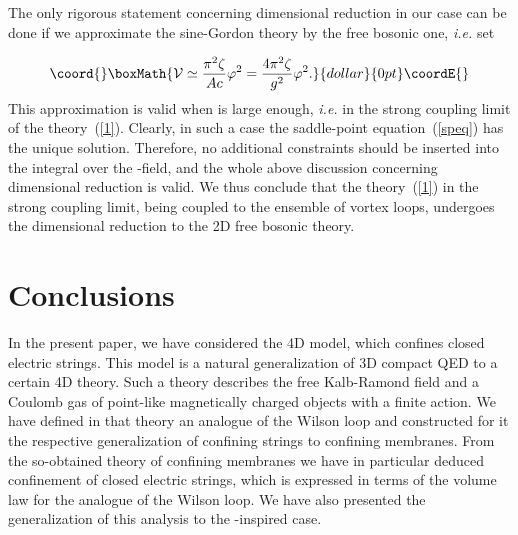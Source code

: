 \documentclass[a4paper,12pt]{article}
\begin{document}
The only rigorous 
statement concerning dimensional reduction in our case can be done if we approximate the sine-Gordon theory by the 
free bosonic one, {\it i.e.} set 

$$\coord{}\boxMath{{\cal V}\simeq \frac{\pi^2\zeta}{Ac}\varphi^2=\frac{4\pi^2\zeta}{g^2}\varphi^2.}{dollar}{0pt}\coordE{}$$ 
This approximation is valid when \coordHE{} is large enough, {\it i.e.} in the strong coupling limit of the theory~(\ref{1}).
Clearly, in such a case the saddle-point equation~(\ref{speq}) has the unique solution. Therefore, no additional constraints should be 
inserted into the integral over the \myHighlight{$\varphi$}\coordHE{}-field, and the whole above discussion 
concerning dimensional reduction is valid. We thus conclude that the theory~(\ref{1}) in the strong coupling limit,
being coupled to the ensemble of vortex loops, undergoes the dimensional reduction to the 2D free bosonic theory.
 



\section{Conclusions}

In the present paper, we have considered the 4D model, which confines closed electric strings. This model
is a natural generalization of 3D compact QED to a certain 4D theory. Such a theory describes the free Kalb-Ramond field 
and a Coulomb gas of point-like magnetically charged 
objects with a finite action. We have defined in that theory an analogue of the Wilson loop and constructed for it the respective generalization 
of confining strings to confining membranes. From the so-obtained theory of confining membranes 
we have in particular deduced confinement of closed electric strings, which 
is expressed in terms of the volume law for the analogue of the Wilson loop. We have also presented the generalization of
this analysis to the \coordHE{}-inspired case. 
\end{document}
